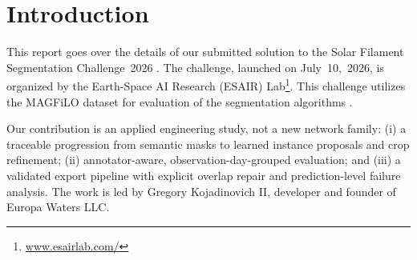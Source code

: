 \documentclass[sigconf]{acmart}
\begin{document}


\section{Introduction}
    This report goes over the details of our submitted solution to the Solar Filament Segmentation Challenge~2026 \cite{filament-segmentation-2026}. The challenge, launched on July~10,~2026, is organized by the Earth-Space AI Research (ESAIR) Lab\footnote{\href{https://www.esairlab.com/home}{www.esairlab.com/}}. This challenge utilizes the MAGFiLO dataset for evaluation of the segmentation algorithms \cite{ahmadzadeh2024dataset}. 

Our contribution is an applied engineering study, not a new network family:
(i) a traceable progression from semantic masks to learned instance proposals
and crop refinement; (ii) annotator-aware, observation-day-grouped evaluation;
and (iii) a validated export pipeline with explicit overlap repair and
prediction-level failure analysis. The work is led by Gregory Kojadinovich II,
developer and founder of Europa Waters LLC.

\end{document}
